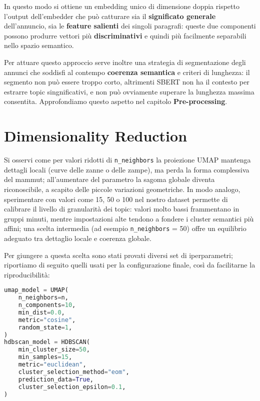 In questo modo si ottiene un embedding unico di dimensione doppia rispetto l'output dell'embedder che può catturare sia il \textbf{significato generale} dell'annuncio, sia le \textbf{feature salienti} dei singoli paragrafi: queste due componenti possono produrre vettori più \textbf{discriminativi} e quindi più facilmente separabili nello spazio semantico.

Per attuare questo approccio serve inoltre una strategia di segmentazione degli annunci che soddisfi al contempo \textbf{coerenza semantica} e criteri di lunghezza: il segmento non può essere troppo corto, altrimenti SBERT non ha il contesto per estrarre topic singnificativi, e non può ovviamente superare la lunghezza massima consentita. Approfondiamo questo aspetto nel capitolo \textbf{Pre-processing}.

\section{Dimensionality Reduction}
Si osservi come per valori ridotti di \texttt{n\_neighbors} la proiezione UMAP mantenga dettagli locali (curve delle zanne o delle zampe), ma perda la forma complessiva del mammut; all'aumentare del parametro la sagoma globale diventa riconoscibile, a scapito delle piccole variazioni geometriche. In modo analogo, sperimentare con valori come 15, 50 o 100 nel nostro dataset permette di calibrare il livello di granularità dei topic: valori molto bassi frammentano in gruppi minuti, mentre impostazioni alte tendono a fondere i cluster semantici più affini; una scelta intermedia (ad esempio \texttt{n\_neighbors} = 50) offre un equilibrio adeguato tra dettaglio locale e coerenza globale.

Per giungere a questa scelta sono stati provati diversi set di iperparametri; riportiamo di seguito quelli usati per la configurazione finale, così da facilitarne la riproducibilità:

\begin{lstlisting}[language=Python]
umap_model = UMAP(
    n_neighbors=n,
    n_components=10,
    min_dist=0.0,
    metric="cosine",
    random_state=1,
)
hdbscan_model = HDBSCAN(
    min_cluster_size=50,
    min_samples=15,
    metric="euclidean",
    cluster_selection_method="eom",
    prediction_data=True,
    cluster_selection_epsilon=0.1,
)
\end{lstlisting}

